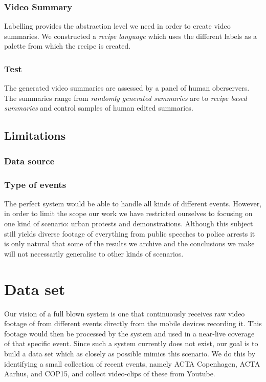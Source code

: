 \subsubsection{Video Summary}
%
Labelling provides the abstraction level we need in order to create video summaries. We constructed a \textit{recipe language} which uses the different labels as a palette from which the recipe is created. 
%
\subsubsection{Test}
%
The generated video summaries are assessed by a panel of human oberservers. The summaries range from \textit{randomly generated summaries} are to \textit{recipe based summaries} and control samples of human edited summaries. 
%
\subsection{Limitations}
%
%
\subsubsection{Data source}
%
%
\subsubsection{Type of events}
%
The perfect system would be able to handle all kinds of different events. However, in order to limit the scope our work we have restricted ourselves to focusing on one kind of scenario: urban protests and demonstrations. Although this subject still yields diverse footage of everything from public speeches to police arrests it is only natural that some of the results we archive and the conclusions we make will not necessarily generalise to other kinds of scenarios.
%
\section{Data set}\label{sec:dataset}
%
Our vision of a full blown system is one that continuously receives raw video footage of from different events directly from the mobile devices recording it. This footage would then be processed by the system and used in a near-live coverage of that specific event. Since such a system currently does not exist, our goal is to build a data set which as closely as possible mimics this scenario. We do this by identifying a small collection of recent events, namely ACTA Copenhagen, ACTA Aarhus, and COP15, and collect video-clips of these from Youtube.
%
